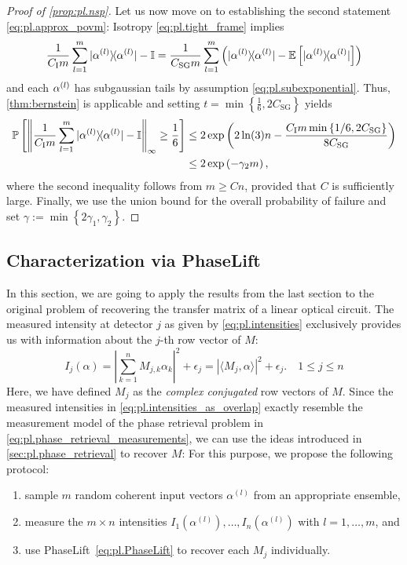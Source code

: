 \begin{proof}[Proof of \cref{prop:pl.nsp}]
  Let us now move on to establishing the second statement \eqref{eq:pl.approx_povm}:
  Isotropy \eqref{eq:pl.tight_frame} implies
  \begin{align}
    \frac{1}{ C_\mathrm{I} m} \sum_{l=1}^m \ketbra{\alpha\ind{l}} - \mathbb{I}
    = \frac{1}{C_\mathrm{SG} m} \sum_{l=1}^m \left( \ketbra{\alpha\ind{l}} - \mathbb{E} \left[ \ketbra{\alpha\ind{l}} \right] \right)
  \end{align}
  and each $\alpha^{(l)}$ has subgaussian tails by assumption \eqref{eq:pl.subexponential}.
  Thus, \cref{thm:bernstein} is applicable and setting $t= \min \left\{\frac{1}{6},2 C_\mathrm{SG} \right\}$ yields
  \begin{align}
    \Prob \left[ \left\| \frac{1}{C_\mathrm{I} m} \sum_{l=1}^m \ketbra{\alpha\ind{l}} -  \mathbb{I} \right\|_\infty \geq \frac{1}{6} \right]
    & \leq 2 \exp \left( 2 \ln (3) n - \frac{C_\mathrm{I} m \min\left\{ 1/6, 2 C_\mathrm{SG} \right\}}{8 C_\mathrm{SG}} \right) \\
    & \leq 2 \exp \left( - \gamma_2 m \right),
  \end{align}
  where the second inequality follows from $m \geq C n$, provided that $C$ is sufficiently large.
  Finally, we use the union bound  for the overall probability of failure and set $\gamma := \min \left\{ 2 \gamma_1,\gamma_2 \right\}$.
\end{proof}


\subsection{Characterization via PhaseLift}%
\label{sub:pl.characterization}

In this section, we are going to apply the results from the last section to the original problem of recovering the transfer matrix of a linear optical circuit.
The measured intensity at detector $j$ as given by \cref{eq:pl.intensities} exclusively provides us with information about the $j$-th row vector of ${M}$:
\[
  I_j({\alpha})
  = \left| \sum_{k=1}^n M_{j,k} \alpha_k \right|^2 + \epsilon_j
  = \left\vert  \langle {M}_j, \alpha \rangle  \right\vert^2 + \epsilon_j. \quad 1 \leq j \leq n
  \label{eq:pl.intensities_as_overlap}
\]
Here, we have defined ${M}_j$ as the \emph{complex conjugated} row vectors of ${M}$.
Since the measured intensities in \cref{eq:pl.intensities_as_overlap} exactly resemble the measurement model of the phase retrieval problem in \cref{eq:pl.phase_retrieval_measurements}, we can use the ideas introduced in \cref{sec:pl.phase_retrieval} to recover $M$:
For this purpose, we propose the following protocol:
\begin{enumerate}
  \item sample $m$ random coherent input vectors $\alpha^{(l)}$ from an appropriate ensemble,
  \item measure the $m \times n$ intensities $I_1(\alpha^{(l)}), \ldots, I_n ( \alpha^{(l)})$ with $l=1,\ldots,m$, and
  \item use PhaseLift~\eqref{eq:pl.PhaseLift} to recover each ${M}_j$ individually.
\end{enumerate}

